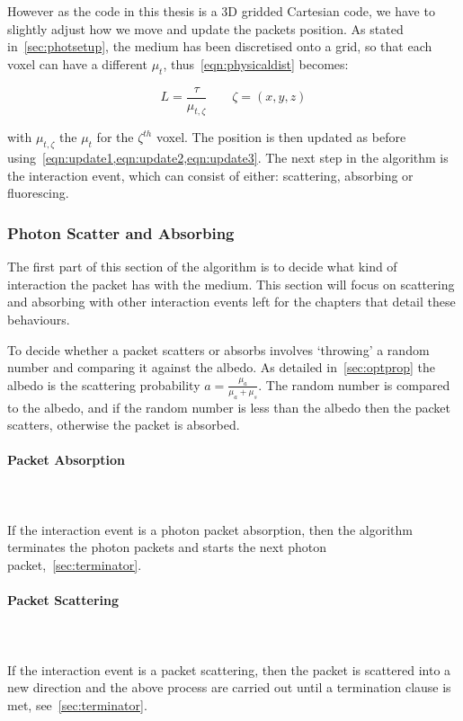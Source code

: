 However as the code in this thesis is a 3D gridded Cartesian code, we have to slightly adjust how we move and update the packets position. As stated in~\cref{sec:photsetup}, the medium has been discretised onto a grid, so that each voxel can have a different $\mu_t$, thus~\cref{eqn:physicaldist} becomes:

\begin{equation}
L=\frac{\tau}{\mu_{t,\zeta}}\quad\quad \zeta=(x,y,z)
\end{equation}

with $\mu_{t,\zeta}$ the $\mu_t$ for the $\zeta^{th}$ voxel. The position is then updated as before using~\cref{eqn:update1,eqn:update2,eqn:update3}. The next step in the algorithm is the interaction event, which can consist of either: scattering, absorbing or fluorescing.

\subsubsection{Photon Scatter and Absorbing}\label{sec:photscatterabsorb}

The first part of this section of the algorithm is to decide what kind of interaction the packet has with the medium. This section will focus on scattering and absorbing with other interaction events left for the chapters that detail these behaviours.
\medskip

To decide whether a packet scatters or absorbs involves `throwing' a random number and comparing it against the albedo. As detailed in~\cref{sec:optprop} the albedo is the scattering probability $a=\tfrac{\mu_a}{\mu_a+\mu_s}$. The random number is compared to the albedo, and if the random number is less than the albedo then the packet scatters, otherwise the packet is absorbed.

\paragraph{Packet Absorption}\hspace{0pt}\\
\\
If the interaction event is a photon packet absorption, then the algorithm terminates the photon packets and starts the next photon packet,~\cref{sec:terminator}.

\paragraph{Packet Scattering}\hspace{0pt}\\
\\
If the interaction event is a packet scattering, then the packet is scattered into a new direction and the above process are carried out until a termination clause is met, see~\cref{sec:terminator}.

